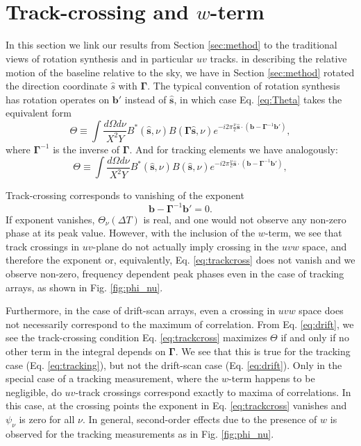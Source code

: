 \documentclass[twocolumn,apj,numberedappendix]{emulateapj}
\renewcommand\[{\begin{equation}}
\renewcommand\]{\end{equation}}
\begin{document}
\section{\\Track-crossing and $w$-term \label{sec:appA}}
\label{sec:appA}
In this section we link our results from Section \ref{sec:method} to the traditional views of rotation synthesis and in particular $uv$ tracks. in describing the relative motion of the baseline relative to the sky, we have in Section \ref{sec:method} rotated the direction coordinate $\hat{s}$ with $\boldsymbol{\Gamma}$. 
The typical convention of rotation synthesis has rotation operates on $\boldsymbol{b'}$ instead of $\hat{\boldsymbol{s}}$, in which case Eq. \eqref{eq:Theta} takes the equivalent form
\begin{equation}
\Theta \equiv\int\frac{d\Omega d\nu}{X^{2}Y}B^{*}(\hat{\boldsymbol{s}},\nu)B(\boldsymbol{\Gamma}\hat{\boldsymbol{s}},\nu) e^{-i2\pi\frac{\nu}{c}\hat{\boldsymbol{s}}\cdot\left(\boldsymbol{b}-\boldsymbol{\Gamma}^{-1}\boldsymbol{b'}\right)}, 
\label{eq:drift}
\end{equation}
where $\boldsymbol{\Gamma}^{-1}$ is the inverse of $\boldsymbol{\Gamma}$. 
And for tracking elements we have analogously:
\begin{equation}
\Theta \equiv\int\frac{d\Omega d\nu}{X^{2}Y}B^{*}(\hat{\boldsymbol{s}},\nu)B(\hat{\boldsymbol{s}},\nu) e^{-i2\pi\frac{\nu}{c}\hat{\boldsymbol{s}}\cdot\left(\boldsymbol{b}-\boldsymbol{\Gamma}^{-1}\boldsymbol{b'}\right)}, 
\label{eq:tracking}
\end{equation}

Track-crossing corresponds to vanishing of the exponent
\[
 \boldsymbol{b}-\boldsymbol{\Gamma}^{-1}\boldsymbol{b'} = 0. \label{eq:trackcross}
 \]
If exponent vanishes, $\Theta_{\nu}(\Delta T)$ is real, and one would not observe any non-zero phase at its peak value. However, with the inclusion of the $w$-term, we see that track crossings in $uv$-plane do not actually imply crossing in the $uvw$ space, and therefore the exponent or, equivalently, Eq. \eqref{eq:trackcross} does not vanish and we observe non-zero, frequency dependent peak phases even in the case of tracking arrays, as shown in Fig. \ref{fig:phi_nu}. 

Furthermore, in the case of drift-scan arrays, even a crossing in $uvw$ space does not necessarily correspond to the maximum of correlation. From Eq. \eqref{eq:drift}, we see the track-crossing condition Eq. \eqref{eq:trackcross} maximizes $\Theta$ if and only if no other term in the integral depends on $\boldsymbol{\Gamma}$. We see that this is true for the tracking case (Eq. \eqref{eq:tracking}), but not the drift-scan case (Eq. \eqref{eq:drift}). Only in the special case of a tracking measurement, where the $w$-term happens to be negligible, do $uv$-track crossings correspond exactly to maxima of correlations. In this case, at the crossing points the exponent in Eq. \eqref{eq:trackcross} vanishes and $\psi_\nu$ is zero for all $\nu$. In general, second-order effects due to the presence of $w$ is observed for the tracking measurements as in Fig. \ref{fig:phi_nu}. 
\end{document}
